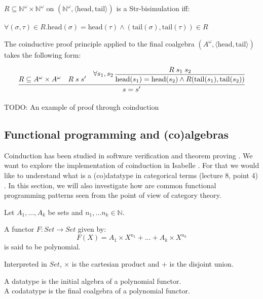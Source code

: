 \begin{lem}
	$R \subseteq \mathbb{N}^{\omega} \times \mathbb{N}^{\omega}$ on $(\mathbb{N}^{\omega}, \langle \text{head}, \text{tail} \rangle)$ is a Str-bisimulation iff:
	
	$\forall (\sigma,\tau) \in R. \text{head}(\sigma) = \text{head}(\tau) \land (\text{tail}(\sigma), \text{tail}(\tau)) \in R$
\end{lem}


\begin{thm}
	The coinductive proof principle applied to the final coalgebra $(A^{\omega}, \langle \text{head}, \text{tail} \rangle)$ takes the following form:
	
	\[
	\infer{s = s'}{%
		R \subseteq A^{\omega} \times A^{\omega}
		& R \; s \; s'
		&
		\qinfer{\forall s_1,s_2}
		{\func{head}(s_1) = \func{head}(s_2) \land R(\func{tail}(s_1), \func{tail}(s_2))}
		{R \; s_1 \; s_2}
	}
	\]
\end{thm}

TODO: An example of proof through coinduction

\subsection{Functional programming and (co)algebras}

Coinduction has been studied in software verification \cite{leino} and theorem proving \cite{blanchette}. We want to explore the implementation of coinduction in Isabelle \cite{blanchette} \cite{sweden}. For that we would like to understand what is a (co)datatype in categorical terms \cite{course} (lecture 8, point 4) \cite{mario}. In this section, we will also investigate how are common functional programming patterns seen from the point of view of category theory.  

\begin{definition}
	Let $A_1, \ldots , A_k$ be sets and $n_1, \ldots n_k \in \mathbb{N}$. 
	
	A functor $F: Set \to Set$ given by: $$F(X) = A_1 \times X^{n_1} + \ldots + A_k \times X^{n_k}$$ is said to be polynomial.
\end{definition}

\begin{remark}
	Interpreted in $Set$, $\times$ is the cartesian product and $+$ is the disjoint union. 
\end{remark}

\begin{definition}[(Co)datatype]
	A datatype is the initial algebra of a polynomial functor. \\
	A codatatype is the final coalgebra of a polynomial functor.
\end{definition}


